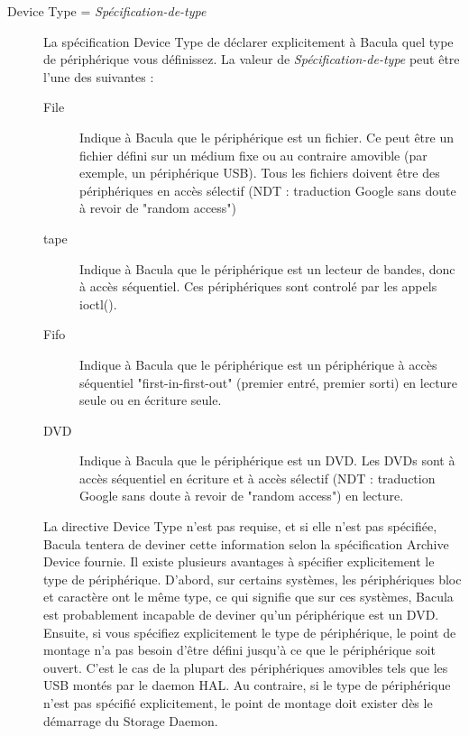 \begin{description}
\item [Device Type = {\it Sp\'ecification-de-type}]
   La sp\'ecification Device Type de d\'eclarer explicitement \`a Bacula quel type  
   de p\'eriph\'erique vous d\'efinissez. La valeur de {\it Sp\'ecification-de-type} peut 
   \^etre l'une des suivantes :
   \begin{description}
   \item [File]
     Indique \`a Bacula que le p\'eriph\'erique est un fichier. Ce peut \^etre 
     un fichier d\'efini sur un m\'edium fixe ou au contraire amovible (par exemple, un 
     p\'eriph\'erique USB). Tous les fichiers doivent \^etre des p\'eriph\'eriques en acc\`es 
     s\'electif (NDT : traduction Google sans doute \`a revoir de "random access")
   \item[tape]
     Indique \`a Bacula que le p\'eriph\'erique est un lecteur de bandes, donc \`a 
     acc\`es s\'equentiel. Ces p\'eriph\'eriques sont control\'e par les appels 
     ioctl().
   \item[Fifo]
      Indique \`a Bacula que le p\'eriph\'erique est un p\'eriph\'erique \`a acc\`es 
      s\'equentiel "first-in-first-out" (premier entr\'e, premier sorti) en 
      lecture seule ou en \'ecriture seule.
   \item[DVD]
      Indique \`a Bacula que le p\'eriph\'erique est un DVD. Les DVDs sont \`a acc\`es 
      s\'equentiel en \'ecriture et \`a acc\`es s\'electif  (NDT : traduction Google sans 
      doute \`a revoir de "random access") en lecture.
   \end{description}
   
  La directive Device Type n'est pas requise, et si elle n'est pas sp\'ecifi\'ee, 
  Bacula tentera de deviner cette information selon la sp\'ecification Archive 
  Device fournie. Il existe plusieurs avantages \`a sp\'ecifier explicitement 
  le type de p\'eriph\'erique. D'abord, sur certains syst\`emes, les p\'eriph\'eriques 
  bloc et caract\`ere ont le m\^eme type, ce qui signifie que sur ces syst\`emes, 
  Bacula est probablement incapable de deviner qu'un p\'eriph\'erique est un DVD. 
  Ensuite, si vous sp\'ecifiez explicitement le type de p\'eriph\'erique, le point de 
  montage n'a pas besoin d'\^etre d\'efini jusqu'\`a ce que le p\'eriph\'erique soit ouvert. 
  C'est le cas de la plupart des p\'eriph\'eriques amovibles tels que les USB mont\'es 
  par le daemon HAL. Au contraire, si le type de p\'eriph\'erique n'est pas 
  sp\'ecifi\'e explicitement, le point de montage doit exister d\`es le 
  d\'emarrage du Storage Daemon.


\end{description}
